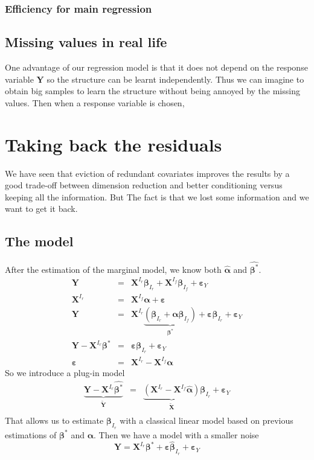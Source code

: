 \documentclass[12pt,a4paper]{report}
\begin{document}
		\subsection{Efficiency for main regression}
	\section{Missing values in real life}
		One advantage of our regression model is that it does not depend on the response variable $\boldsymbol{Y}$ so the structure can be learnt independently. Thus we can imagine to obtain big samples to learn the structure without being annoyed by the missing values. Then when a response variable is chosen,  
\chapter{Taking back the residuals}
	We have seen that eviction of redundant covariates improves the results by a good trade-off between dimension reduction and better conditioning versus keeping all the information. But The fact is that we lost some information and we want to get it back.
	\section{The model}
		After the estimation of the marginal model, we know both $\hat{\boldsymbol{\alpha}}$ and $\hat{\boldsymbol{\beta}^*}$.
		\begin{eqnarray}
			\boldsymbol{Y}&=& \boldsymbol{X}^{I_r}\boldsymbol{\beta}_{I_r}+\boldsymbol{X}^{I_f}\boldsymbol{\beta}_{I_f}+\boldsymbol{\varepsilon}_Y \\
			\boldsymbol{X}^{I_r}&=&\boldsymbol{X}^{I_f}\boldsymbol{\alpha}+\boldsymbol{\varepsilon} \\
			\boldsymbol{Y}&=& \boldsymbol{X}^{I_r}\underbrace{(\boldsymbol{\beta}_{I_r}+\boldsymbol{\alpha}\boldsymbol{\beta}_{I_f})}_{\boldsymbol{\beta}^*}+\boldsymbol{\varepsilon}\boldsymbol{\beta}_{I_r}+\boldsymbol{\varepsilon}_Y \\
			\boldsymbol{Y}- \boldsymbol{X}^{I_r}\boldsymbol{\beta}^*&=&\boldsymbol{\varepsilon}\boldsymbol{\beta}_{I_r}+\boldsymbol{\varepsilon}_Y \\
			\boldsymbol{\varepsilon}&=&\boldsymbol{X}^{I_r}-\boldsymbol{X}^{I_f}\boldsymbol{\alpha}
		\end{eqnarray}		 
		So we introduce a plug-in model
		\begin{eqnarray}
			\underbrace{\boldsymbol{Y}- \boldsymbol{X}^{I_r}\hat{\boldsymbol{\beta}^*}}_{\tilde{\boldsymbol{Y}}}&=&\underbrace{(\boldsymbol{X}^{I_r}-\boldsymbol{X}^{I_f}\hat{\boldsymbol{\alpha}})}_{\tilde{\boldsymbol{X}}}\boldsymbol{\beta}_{I_r}+\boldsymbol{\varepsilon}_Y \\
		\end{eqnarray}
		That allows us to estimate $\boldsymbol{\beta}_{I_r}$ with a classical linear model based on previous estimations of $\boldsymbol{\beta}^*$ and $\boldsymbol{\alpha}$.
		Then we have a model with a smaller noise
		\begin{equation}
			\boldsymbol{Y}= \boldsymbol{X}^{I_r}\boldsymbol{\beta}^* + \boldsymbol{\varepsilon}\hat{\boldsymbol{\beta}}_{I_r}+\boldsymbol{\varepsilon}_Y 
		\end{equation}
\end{document}
